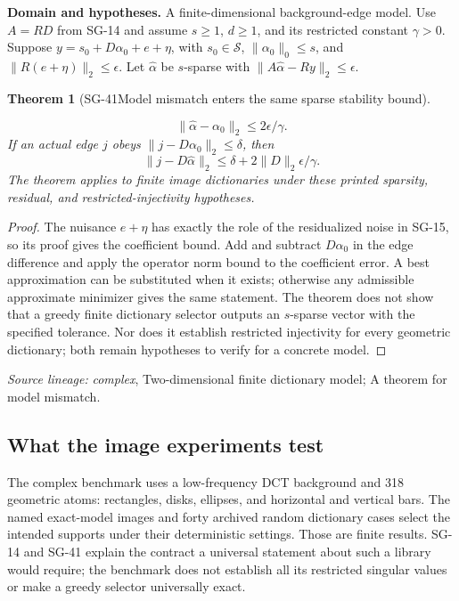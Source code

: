 \documentclass[11pt]{article}
\newtheorem{theorem}{Theorem}[section]
\theoremstyle{definition}\newtheorem{definition}[theorem]{Definition}
\theoremstyle{remark}\newtheorem{remark}[theorem]{Remark}
\begin{document}
\par{\small\textbf{Domain and hypotheses.} A finite-dimensional background-edge model. Use $A=RD$ from SG-14 and assume $s\ge1$, $d\ge1$, and its restricted constant $\gamma>0$. Suppose $y=s_0+D\alpha_0+e+\eta$, with $s_0\in\mathcal S$, $\|\alpha_0\|_0\le s$, and $\|R(e+\eta)\|_2\le\epsilon$. Let $\widehat\alpha$ be $s$-sparse with $\|A\widehat\alpha-Ry\|_2\le\epsilon$.}\par
\begin{theorem}[SG-41\quad Model mismatch enters the same sparse stability bound]\label{SG-41}

\[
 \|\widehat\alpha-\alpha_0\|_2\le2\epsilon/\gamma.
\]
If an actual edge $j$ obeys $\|j-D\alpha_0\|_2\le\delta$, then
\[
 \|j-D\widehat\alpha\|_2\le\delta+2\|D\|_2\epsilon/\gamma.
\]
The theorem applies to finite image dictionaries under these printed
sparsity, residual, and restricted-injectivity hypotheses.

\end{theorem}
\begin{proof}

The nuisance $e+\eta$ has exactly the role of the residualized noise in
SG-15, so its proof gives the coefficient bound. Add and subtract
$D\alpha_0$ in the edge difference and apply the operator norm bound to the
coefficient error. A best approximation can be substituted when it exists;
otherwise any admissible approximate minimizer gives the same statement.
The theorem does not show that a greedy finite dictionary selector outputs
an $s$-sparse vector with the specified tolerance. Nor does it establish
restricted injectivity for every geometric dictionary; both remain
hypotheses to verify for a concrete model.

\end{proof}

\par{\small\color{Teal}\textit{Source lineage:} \textit{complex}, Two-dimensional finite dictionary model; A theorem for model mismatch.}\par

\subsection{What the image experiments test}

The complex benchmark uses a low-frequency DCT background and 318 geometric
atoms: rectangles, disks, ellipses, and horizontal and vertical bars.
The named exact-model images and forty archived random dictionary cases select
the intended supports under their deterministic settings. Those are finite
results. SG-14 and SG-41 explain the contract a universal statement about
such a library would require; the benchmark does not establish all its
restricted singular values or make a greedy selector universally exact.
\end{document}
